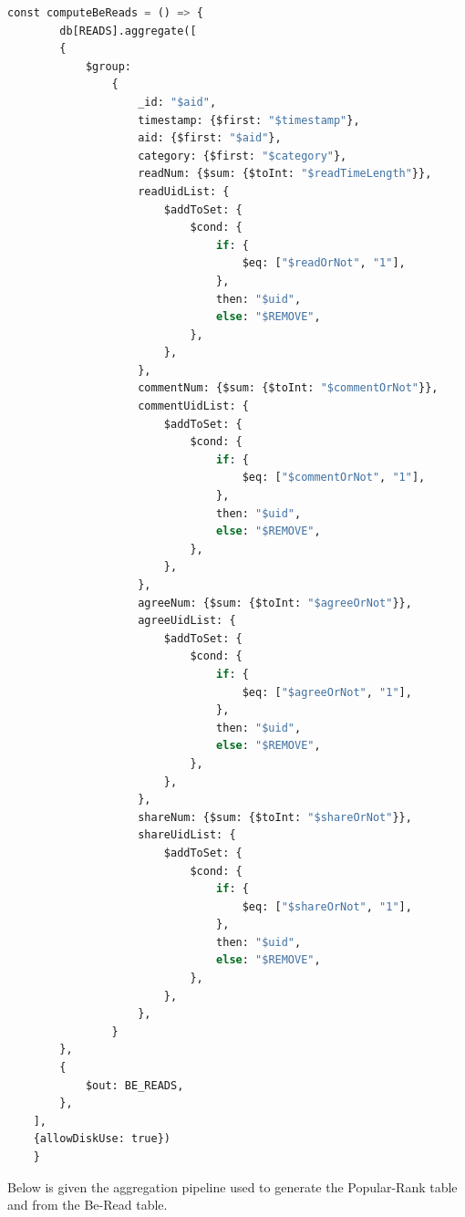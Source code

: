 \documentclass{article}
\begin{document}
    \begin{lstlisting}[language=Python, caption=Aggregation pipeline for generating Be-Read table]
    const computeBeReads = () => {
        db[READS].aggregate([
        {
            $group:
                {
                    _id: "$aid",
                    timestamp: {$first: "$timestamp"},
                    aid: {$first: "$aid"},
                    category: {$first: "$category"},
                    readNum: {$sum: {$toInt: "$readTimeLength"}},
                    readUidList: {
                        $addToSet: {
                            $cond: {
                                if: {
                                    $eq: ["$readOrNot", "1"],
                                },
                                then: "$uid",
                                else: "$REMOVE",
                            },
                        },
                    },
                    commentNum: {$sum: {$toInt: "$commentOrNot"}},
                    commentUidList: {
                        $addToSet: {
                            $cond: {
                                if: {
                                    $eq: ["$commentOrNot", "1"],
                                },
                                then: "$uid",
                                else: "$REMOVE",
                            },
                        },
                    },
                    agreeNum: {$sum: {$toInt: "$agreeOrNot"}},
                    agreeUidList: {
                        $addToSet: {
                            $cond: {
                                if: {
                                    $eq: ["$agreeOrNot", "1"],
                                },
                                then: "$uid",
                                else: "$REMOVE",
                            },
                        },
                    },
                    shareNum: {$sum: {$toInt: "$shareOrNot"}},
                    shareUidList: {
                        $addToSet: {
                            $cond: {
                                if: {
                                    $eq: ["$shareOrNot", "1"],
                                },
                                then: "$uid",
                                else: "$REMOVE",
                            },
                        },
                    },
                }
        },
        {
            $out: BE_READS,
        },
    ],
    {allowDiskUse: true})
    }
    \end{lstlisting}
    Below is given the aggregation pipeline used to generate the Popular-Rank table and from the Be-Read table.
\end{document}
